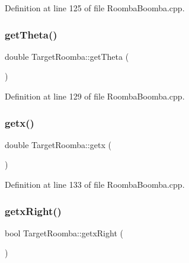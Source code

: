 Definition at line 125 of file Roomba\+Boomba.\+cpp.

\mbox{\label{classTargetRoomba_a6cc8b96c9db2bda4bc1b6babe978b392}} 
\subsubsection{\texorpdfstring{getTheta()}{getTheta()}}
{\footnotesize\ttfamily double Target\+Roomba\+::get\+Theta (\begin{DoxyParamCaption}{ }\end{DoxyParamCaption})\hspace{0.3cm}{\ttfamily [inline]}}



Definition at line 129 of file Roomba\+Boomba.\+cpp.

\mbox{\label{classTargetRoomba_ab58023ab557011b4b495cbb715007c36}} 
\subsubsection{\texorpdfstring{getx()}{getx()}}
{\footnotesize\ttfamily double Target\+Roomba\+::getx (\begin{DoxyParamCaption}{ }\end{DoxyParamCaption})\hspace{0.3cm}{\ttfamily [inline]}}



Definition at line 133 of file Roomba\+Boomba.\+cpp.

\mbox{\label{classTargetRoomba_acf8c3222e1640068d2e0cfce91a31363}} 
\subsubsection{\texorpdfstring{getxRight()}{getxRight()}}
{\footnotesize\ttfamily bool Target\+Roomba\+::getx\+Right (\begin{DoxyParamCaption}{ }\end{DoxyParamCaption})\hspace{0.3cm}{\ttfamily [inline]}}



